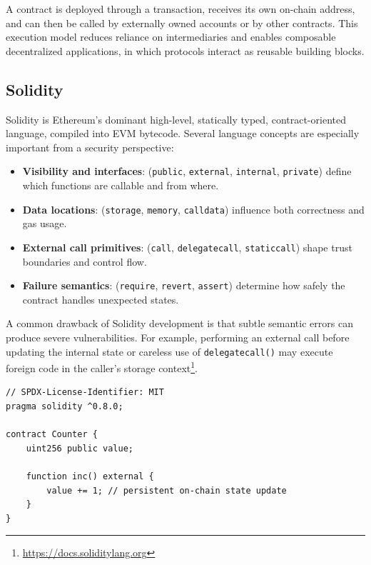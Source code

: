 A contract is deployed through a transaction, receives its own on-chain address, and can then be called by externally owned accounts or by other contracts. This execution model reduces reliance on intermediaries and enables composable decentralized applications, in which protocols interact as reusable building blocks.

\subsection{Solidity}
\label{subsec:solidity}

Solidity is Ethereum's dominant high-level, statically typed, contract-oriented language, compiled into EVM bytecode. Several language concepts are especially important from a security perspective:

\begin{itemize}
    \item \textbf{Visibility and interfaces}: (\texttt{public}, \texttt{external}, \texttt{internal}, \texttt{private}) define which functions are callable and from where.
    \item \textbf{Data locations}: (\texttt{storage}, \texttt{memory}, \texttt{calldata}) influence both correctness and gas usage.
    \item \textbf{External call primitives}: (\texttt{call}, \texttt{delegatecall}, \texttt{staticcall}) shape trust boundaries and control flow.
    \item \textbf{Failure semantics}: (\texttt{require}, \texttt{revert}, \texttt{assert}) determine how safely the contract handles unexpected states.
\end{itemize}

A common drawback of Solidity development is that subtle semantic errors can produce severe vulnerabilities. For example, performing an external call before updating the internal state or careless use of \texttt{delegatecall()} may execute foreign code in the caller's storage context\footnote{\url{https://docs.soliditylang.org}}.

\newpage

\begin{listing}[!ht]
\begin{verbatim}
// SPDX-License-Identifier: MIT
pragma solidity ^0.8.0;

contract Counter {
    uint256 public value;

    function inc() external {
        value += 1; // persistent on-chain state update
    }
}
\end{verbatim}
\caption[Minimal stateful Solidity contract.]{A minimal stateful Solidity contract.}
\label{lst:counter-stateful}
\end{listing}


